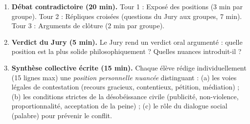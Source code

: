 \documentclass[11pt]{article}
\begin{document}
\begin{enumerate}
\begin{itemize}
    \end{itemize}
    \item \textbf{Débat contradictoire (20 min).} Tour 1 : Exposé des positions (3 min par groupe). Tour 2 : Répliques croisées (questions du Jury aux groupes, 7 min). Tour 3 : Arguments de clôture (2 min par groupe).
    \item \textbf{Verdict du Jury (5 min).} Le Jury rend un verdict oral argumenté : quelle position est la plus solide philosophiquement ? Quelles nuances introduit-il ?
    \item \textbf{Synthèse collective écrite (15 min).} Chaque élève rédige individuellement (15 lignes max) une \emph{position personnelle nuancée} distinguant : (a) les voies légales de contestation (recours gracieux, contentieux, pétition, médiation) ; (b) les conditions strictes de la désobéissance civile (publicité, non-violence, proportionnalité, acceptation de la peine) ; (c) le rôle du dialogue social (palabre) pour prévenir le conflit.
\end{enumerate}
\end{document}
